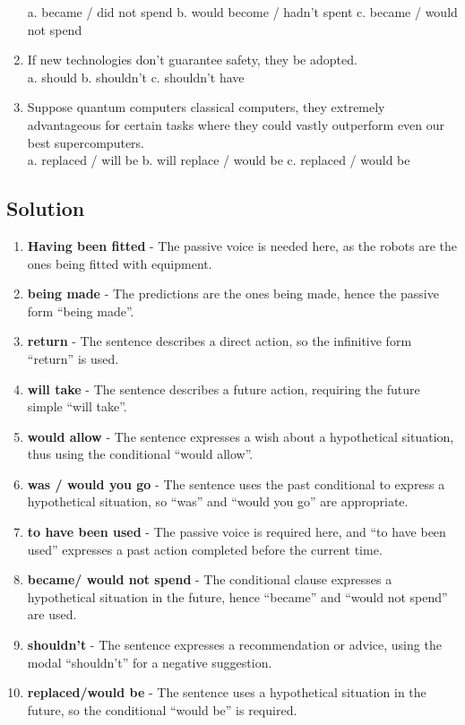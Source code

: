 \begin{enumerate}
            a. became / did not spend \hfill b. would become / hadn’t spent \hfill c. became / would not spend
      \item If new technologies don’t guarantee safety, they \underline{\hspace{2cm}} be adopted.\\
            a. should \hfill b. shouldn’t \hfill c. shouldn’t have
      \item Suppose quantum computers \underline{\hspace{2cm}} classical computers, they \underline{\hspace{2cm}} extremely advantageous for certain tasks where they could vastly outperform even our best supercomputers.\\
            a. replaced / will be \hfill b. will replace / would be \hfill c. replaced / would be
\end{enumerate}

\subsection*{Solution}
\begin{enumerate}
      \item \textbf{Having been fitted} - The passive voice is needed here, as the robots are the ones being fitted with equipment.
      \item \textbf{being made} - The predictions are the ones being made, hence the passive form “being made”.
      \item \textbf{return} - The sentence describes a direct action, so the infinitive form “return” is used.
      \item \textbf{will take} - The sentence describes a future action, requiring the future simple “will take”.
      \item \textbf{would allow} - The sentence expresses a wish about a hypothetical situation, thus using the conditional “would allow”.
      \item \textbf{was / would you go} - The sentence uses the past conditional to express a hypothetical situation, so “was” and “would you go” are appropriate.
      \item \textbf{to have been used} - The passive voice is required here, and “to have been used” expresses a past action completed before the current time.
      \item \textbf{became/ would not spend} - The conditional clause expresses a hypothetical situation in the future, hence “became” and “would not spend” are used.
      \item \textbf{shouldn’t} - The sentence expresses a recommendation or advice, using the modal “shouldn’t” for a negative suggestion.
      \item \textbf{replaced/would be} - The sentence uses a hypothetical situation in the future, so the conditional “would be” is required.
\end{enumerate}
